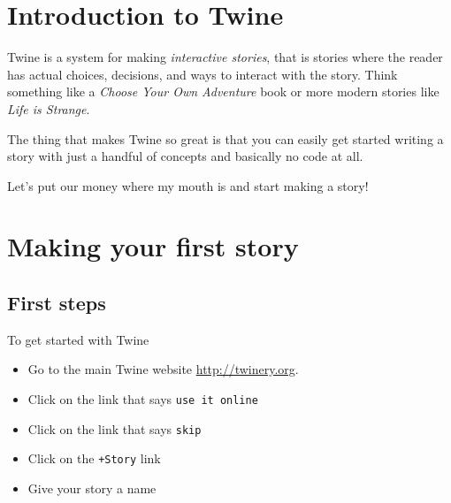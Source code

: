 \documentclass[a5paper,11pt]{article}
\title{}
\date{}
\begin{document}
\newcommand{\BackgroundPic}[1]{%
\put(0,0){%
\parbox[b][\paperheight]{\paperwidth}{%
\vfill
\centering
{\transparent{0.6} \texttt{[image: \#1]}}%
\vfill
}}}

\newcommand{\TitlePic}[1]{%
\put(0,0){%
\parbox[b][\paperheight]{\paperwidth}{%
\vfill
\centering
{\transparent{0.9} \texttt{[image: \#1]}}%
\vfill
}}}


\begingroup
\let\cleardoublepage\clearpage

\AddToShipoutPictureBG*{\TitlePic{TwineTitle}}
\begin{titlingpage}
  \maketitle
\end{titlingpage}
\endgroup
 
\newpage

\tableofcontents

\newpage 
\section{Introduction to Twine}
Twine is a system for making \emph{interactive stories}, that is stories where the reader has actual choices, decisions, and ways to interact with the story. Think something like a \emph{Choose Your Own Adventure} book or more modern stories like \emph{Life is Strange}.

The thing that makes Twine so great is that you can easily get started writing a story with just a handful of concepts and basically no code at all.

Let's put our money where my mouth is and start making a story!
\newpage
\section{Making your first story}
\subsection{First steps}
To get started with Twine

\begin{itemize}
 \item Go to the main Twine website \url{http://twinery.org}. 
 \item Click on the link that says \verb"use it online"
 \item Click on the link that says \verb"skip"
 \item Click on the \verb"+Story" link
 \item Give your story a name
\end{itemize}
\end{document}
